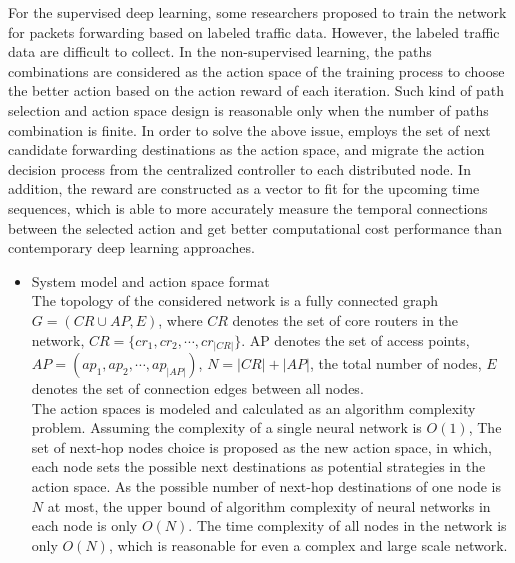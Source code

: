 \documentclass[11pt]{report}
\begin{document}
	\noindent For the supervised deep learning, some researchers proposed to train the network for packets forwarding based on labeled traffic data. However, the labeled traffic data are difficult to collect. In the non-supervised learning, the paths combinations are considered as the action space of the training process to choose the better action based on the action reward of each iteration. Such kind of path selection and action space design is reasonable only when the number of paths combination is finite. In order to solve the above issue, \cite{8489985} employs the set of next candidate forwarding destinations as the action space, and migrate the action decision process from the centralized controller to each distributed node. In addition, the reward are constructed as a vector to fit for the upcoming time sequences, which is able to more accurately measure the temporal connections between the selected action and get better computational cost performance than contemporary deep learning approaches.
	\begin{itemize}
		\item System model and action space format\\
		The topology of the considered network is a fully connected graph $G=\left(CR\cup AP,E\right)$, where $CR$ denotes the set of core routers in the network, $CR=\{cr_1,cr_2, \cdots, cr_{|CR|}\}$. AP denotes the set of access points, $AP=\left(ap_1,ap_2,\cdots,ap_{|AP|}\right)$, $N=|CR|+|AP|$, the total number of nodes, $E$ denotes the set of connection edges between all nodes. \\
		The action spaces is modeled and calculated as an algorithm complexity problem. Assuming the complexity of a single neural network is $\mathit{O}\left(1\right)$, The set of next-hop nodes choice is proposed as the new action space, in which, each node sets the possible next destinations as potential strategies in the action space. As the possible number of next-hop destinations of one node is $N$ at most, the upper bound of algorithm complexity of neural networks in each node is only $\mathit{O}\left(N\right)$. The time complexity of all nodes in the network is only $\mathit{O}\left(N\right)$, which is reasonable for even a complex and large scale network.
	\end{itemize}
\end{document}
